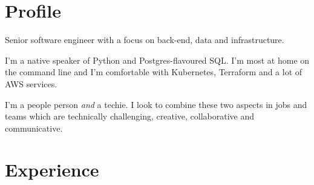 \documentclass[a4paper,nomath]{deedy-resume} %
\begin{document}

\lastupdated %


%
\begin{paracol}{2} %


    \section{Profile}
    \flushleft
    Senior software engineer with a focus on back-end, data and infrastructure.

    \vspace{\topsep}

    I'm a native speaker of Python and Postgres-flavoured SQL.
    I'm most at home on the command line and I'm comfortable with Kubernetes,
    Terraform and a lot of AWS services.
    
    \vspace{\topsep}

    I'm a people person \textit{and} a techie. I look to combine these two
    aspects in jobs and teams which are technically challenging, creative,
    collaborative and communicative.

    \sectionspace %

    \section{Experience}

    

\end{paracol}
\end{document}
